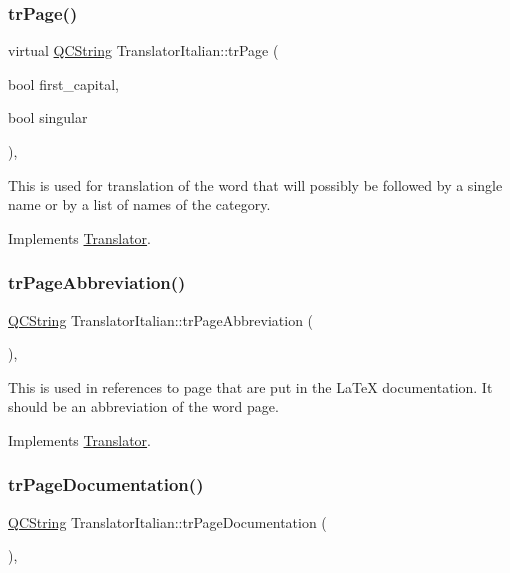 \subsubsection{\texorpdfstring{trPage()}{trPage()}}
{\footnotesize\ttfamily virtual \mbox{\hyperlink{class_q_c_string}{Q\+C\+String}} Translator\+Italian\+::tr\+Page (\begin{DoxyParamCaption}\item[{bool}]{first\+\_\+capital,  }\item[{bool}]{singular }\end{DoxyParamCaption})\hspace{0.3cm}{\ttfamily [inline]}, {\ttfamily [virtual]}}

This is used for translation of the word that will possibly be followed by a single name or by a list of names of the category. 

Implements \mbox{\hyperlink{class_translator}{Translator}}.

\mbox{\label{class_translator_italian_a2a749b009f36458a6c6c5eefd3ee21c3}} 
\subsubsection{\texorpdfstring{trPageAbbreviation()}{trPageAbbreviation()}}
{\footnotesize\ttfamily \mbox{\hyperlink{class_q_c_string}{Q\+C\+String}} Translator\+Italian\+::tr\+Page\+Abbreviation (\begin{DoxyParamCaption}{ }\end{DoxyParamCaption})\hspace{0.3cm}{\ttfamily [inline]}, {\ttfamily [virtual]}}

This is used in references to page that are put in the La\+TeX documentation. It should be an abbreviation of the word page. 

Implements \mbox{\hyperlink{class_translator}{Translator}}.

\mbox{\label{class_translator_italian_a639a67244650596600ad6ed801423df5}} 
\subsubsection{\texorpdfstring{trPageDocumentation()}{trPageDocumentation()}}
{\footnotesize\ttfamily \mbox{\hyperlink{class_q_c_string}{Q\+C\+String}} Translator\+Italian\+::tr\+Page\+Documentation (\begin{DoxyParamCaption}{ }\end{DoxyParamCaption})\hspace{0.3cm}{\ttfamily [inline]}, {\ttfamily [virtual]}}

